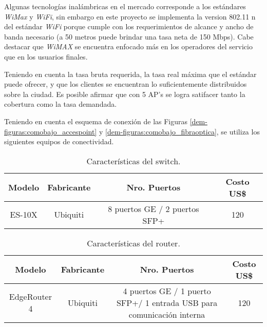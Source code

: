 Algunas tecnologías inalámbricas en el mercado corresponde a los estándares \textit{WiMax} y \textit{WiFi}, sin embargo en este proyecto se implementa la version 802.11 n del estándar \textit{WiFi} porque cumple con los requerimientos de alcance y ancho de banda necesario (a 50 metros puede brindar una tasa neta de 150 Mbps). Cabe destacar que \textit{WiMAX} se encuentra enfocado más en los operadores del servicio que en los usuarios finales\cite{wifivswimax}.

Teniendo en cuenta la tasa bruta requerida, la tasa real máxima que el estándar puede ofrecer, y que los clientes se encuentran lo suficientemente distribuidos sobre la ciudad. Es posible afirmar que con 5 AP's se logra satifacer tanto la cobertura como la tasa demandada.





Teniendo en cuenta el esquema de conexión de las Figuras \ref{dem-figuras:comobajo_accespoint} y \ref{dem-figuras:comobajo_fibraoptica}, se utiliza los siguientes equipos de conectividad.



\begin{table}[H]
  \tiny
  \centering
    \begin{tabular}{|c|c|c|c|}
    \hline
    \rowcolor[rgb]{ .773,  .851,  .945} \textbf{Modelo} & \textbf{Fabricante} & \textbf{Nro. Puertos} & \textbf{Costo US\$} \bigstrut\\
    \hline
    ES-10X &   Ubiquiti    & 8 puertos GE / 2 puertos SFP+ & 120 \bigstrut\\
    \hline
    \end{tabular}%
	\caption{Características del switch.}
  \label{tab:caracteristicas-switch}%
\end{table}%



\begin{table}[H]
  \tiny
  \centering
  
    \begin{tabular}{|c|c|c|c|}
    \hline
    \rowcolor[rgb]{ .773,  .851,  .945} \textbf{Modelo} & \textbf{Fabricante} & \textbf{Nro. Puertos} & \textbf{Costo US\$} \bigstrut\\
    \hline
    EdgeRouter 4 & Ubiquiti & 4 puertos GE / 1 puerto SFP+/ 1 entrada USB para comunicación interna & 120 \bigstrut\\
    \hline
    \end{tabular}%
	\caption{Características del router.}
  \label{tab:caracteristicas-router}%
\end{table}%


